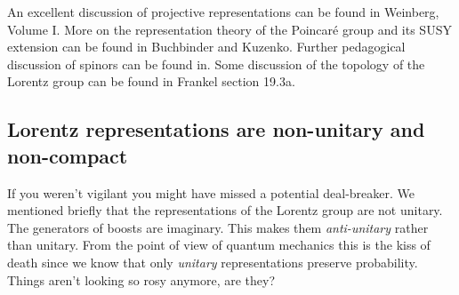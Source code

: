 An excellent discussion of projective representations can be found in Weinberg, Volume I\autocite{Weinberg:1995mt}. 
    More on the representation theory of the Poincar\'e group and its SUSY extension can be found in Buchbinder and Kuzenko\autocite{Buchbinder:1998qv}. Further pedagogical discussion of spinors can be found in\autocite{spinorspanner}. Some discussion of the topology of the Lorentz group can be found in Frankel section 19.3a\autocite{Frankel:2004}.

\subsection{Lorentz representations are non-unitary and non-compact}\label{sec:SUSYalg:nonunitary}
If you weren't vigilant you might have missed a potential deal-breaker. We mentioned briefly that the representations of the Lorentz group are not unitary. The generators of boosts are imaginary. This makes them \textit{anti-unitary} rather than unitary. From the point of view of quantum mechanics this is the kiss of death since we know that only \textit{unitary} representations preserve probability. Things aren't looking so rosy anymore, are they? 

